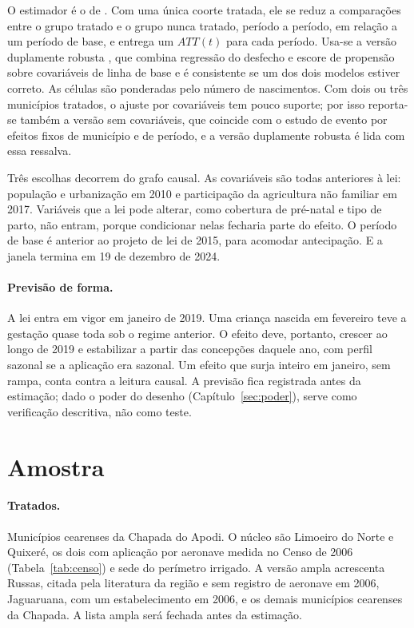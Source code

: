 O estimador é o de . Com uma única coorte tratada,
ele se reduz a comparações entre o grupo tratado e o grupo nunca tratado,
período a período, em relação a um período de base, e entrega um $ATT(t)$ para
cada período. Usa-se a versão duplamente robusta \cite{santanna2020drdid}, que
combina regressão do desfecho e escore de propensão sobre covariáveis de linha
de base e é consistente se um dos dois modelos estiver correto. As células são
ponderadas pelo número de nascimentos. Com dois ou três municípios tratados, o
ajuste por covariáveis tem pouco suporte; por isso reporta-se também a versão
sem covariáveis, que coincide com o estudo de evento por efeitos fixos de
município e de período, e a versão duplamente robusta é lida com essa
ressalva.

Três escolhas decorrem do grafo causal. As covariáveis são todas anteriores à
lei: população e urbanização em 2010 e participação da agricultura não familiar
em 2017.
Variáveis que a lei pode alterar, como cobertura de pré-natal e tipo de parto,
não entram, porque condicionar nelas fecharia parte do efeito. O período de base
é anterior ao projeto de lei de 2015, para acomodar antecipação. E a janela
termina em 19 de dezembro de 2024.

\paragraph{Previsão de forma.} A lei entra em vigor em janeiro de 2019. Uma
criança nascida em fevereiro teve a gestação quase toda sob o regime anterior.
O efeito deve, portanto, crescer ao longo de 2019 e estabilizar a partir das
concepções daquele ano, com perfil sazonal se a aplicação era sazonal. Um
efeito que surja inteiro em janeiro, sem rampa, conta contra a leitura causal.
A previsão fica registrada antes da estimação; dado o poder do desenho
(Capítulo~\ref{sec:poder}), serve como verificação descritiva, não como teste.

\section{Amostra}

\paragraph{Tratados.} Municípios cearenses da Chapada do Apodi. O núcleo são
Limoeiro do Norte e Quixeré, os dois com aplicação por aeronave medida no Censo
de 2006 (Tabela~\ref{tab:censo}) e sede do perímetro irrigado. A versão ampla
acrescenta Russas, citada pela literatura da região e sem registro de aeronave
em 2006, Jaguaruana, com um estabelecimento em 2006, e os demais municípios
cearenses da Chapada. A lista ampla será fechada antes da estimação.

